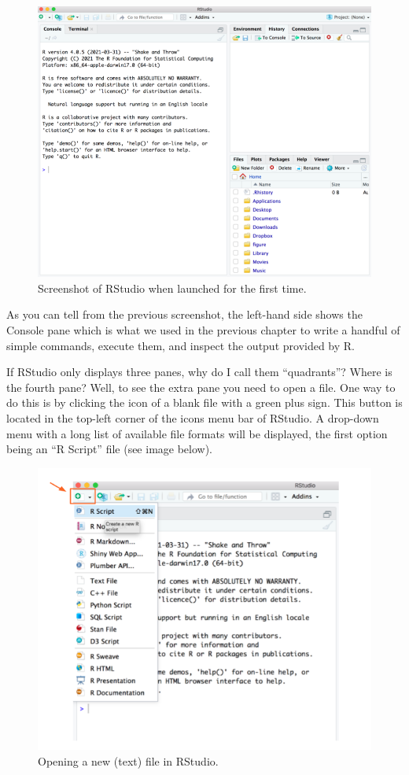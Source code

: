 \documentclass[
]{book}
\begin{document}
\begin{figure}

{\centering \includegraphics[width=0.7\linewidth]{images/rstudio/rstudio-launch-first-time} 

}

\caption{Screenshot of RStudio when launched for the first time.}\label{fig:unnamed-chunk-24}
\end{figure}

As you can tell from the previous screenshot, the left-hand side shows the
Console pane which is what we used in the previous chapter to write a handful
of simple commands, execute them, and inspect the output provided by R.

If RStudio only displays three panes, why do I call them ``quadrants''? Where is
the fourth pane? Well, to see the extra pane you need to open a file. One
way to do this is by clicking the icon of a blank file with a green plus sign.
This button is located in the top-left corner of the icons menu bar of RStudio.
A drop-down menu with a long list of available file formats will be displayed,
the first option being an ``R Script'' file (see image below).

\begin{figure}

{\centering \includegraphics[width=0.6\linewidth]{images/rstudio/rstudio-new-file} 

}

\caption{Opening a new (text) file in RStudio.}\label{fig:unnamed-chunk-25}
\end{figure}
\end{document}
